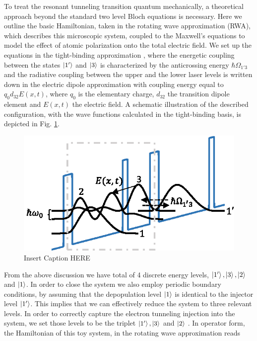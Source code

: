 \documentclass[]{spie}  %
\begin{document}
To treat the resonant tunneling transition quantum mechanically, a theoretical approach beyond the standard two level Bloch equations is necessary. Here we outline the basic Hamiltonian, taken in the rotating wave approximation (RWA), which describes this microscopic system, coupled to the Maxwell's equations to model the effect of atomic polarization onto the total electric field. We set up the equations in the tight-binding approximation \cite{bastardwave}, where the energetic coupling between the states $\ket{1'}$ and $\ket{3}$ is characterized by the anticrossing energy $\hbar \Omega_{1'3}$ and the radiative coupling between the upper and the lower laser levels is written down in the electric dipole approximation with coupling energy equal to $q_0d_{32}E(x,t)$, where $q_0$ is the elementary charge, $d_{32}$ the transition dipole element and $E(x,t)$ the electric field. A schematic illustration of the described configuration, with the wave functions calculated in the tight-binding basis, is depicted in Fig. \ref{fig:3lvlsystem}.
\begin{figure}[h!]
	\begin{center}
		\includegraphics[scale=1]{IMGS/TOY3LVLSYSTEM.eps}
		\caption{ Insert Caption HERE} \label{fig:3lvlsystem}
	\end{center}	
\end{figure}
From the above discussion we have total of 4 discrete energy levels, $\ket{1'},\ket{3},\ket{2}$ and $\ket{1}$. In order to close the system we also employ periodic boundary conditions, by assuming that the depopulation level $\ket{1}$ is identical to the injector level $\ket{1'}$. This implies that we can effectively reduce the system to three relevant levels. In order to correctly capture the electron tunneling injection into the system, we set those levels to be the triplet $\ket{1'},\ket{3}$ and $\ket{2}$ \cite{callebaut2005importance,kumar2009coherence}. In operator form, the Hamiltonian of this toy system, in the rotating wave approximation reads 
\end{document}
